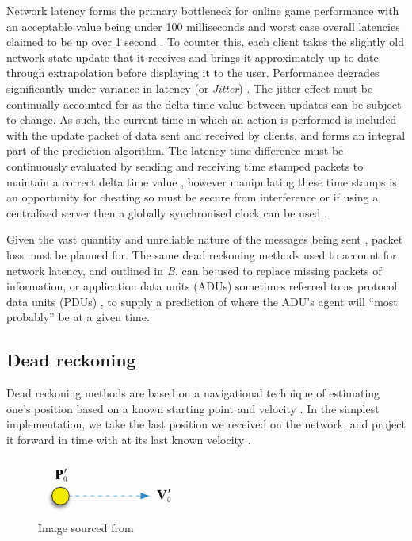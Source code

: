 \documentclass[journal]{IEEEtran}
\begin{document}
Network latency forms the primary bottleneck for online game performance with an acceptable value being under 100 milliseconds \cite{smed2002aspects} and worst case overall latencies claimed to be up over 1 second \cite{claypool2006latency}. To counter this, each client takes the slightly old network state update that it receives and brings it approximately up to date through extrapolation before displaying it to the user. Performance degrades significantly under variance in latency (or \textit{Jitter}) \cite{beigbeder2004effects} \cite{dick2005analysis}. The jitter effect must be continually accounted for as the delta time value between updates can be subject to change. As such, the current time in which an action is performed is included with the update packet of data sent and received by clients, and forms an integral part of the prediction algorithm. The latency time difference must be continuously evaluated by sending and receiving time stamped packets to maintain a correct delta time value \cite{glazer2015multiplayer}, however manipulating these time stamps is an opportunity for cheating \cite{jamin2003cheat} so must be secure from interference or if using a centralised server then a globally synchronised clock can be used \cite{aggarwal2004accuracy}.

Given the vast quantity and unreliable nature of the messages being sent \cite{cronin2001distributed}, packet loss must be planned for. The same dead reckoning methods used to account for network latency, and outlined in \textit{B.} can be used to replace missing packets of information, or application data units (ADUs) \cite{diot1999distributed} sometimes referred to as protocol data units (PDUs) \cite{dis1998ieee}, to supply a prediction of where the ADU's agent will ``most probably'' be at a given time.

\subsection{Dead reckoning}

Dead reckoning methods are based on a navigational technique of estimating one’s position based on a known starting point and velocity \cite{smed2002aspects}. In the simplest implementation, we take the last position we received on the network, and project it forward in time with at its last known velocity \cite{murphy2011believable}.

\begin{figure}[h]
    \centering
    \includegraphics[width=0.5\linewidth]{DR1.png}
    \caption{Image sourced from \cite{murphy2011believable}}
    \label{fig:dr1}
\end{figure}
\end{document}
